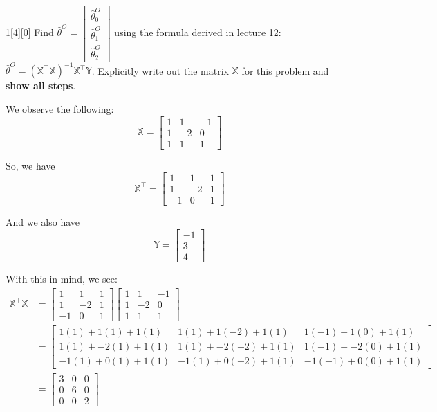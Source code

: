 \documentclass{article}
\begin{document}
\begin{dshw}{1}[4][0]
	Find $\hat{\theta}^O = \begin{bmatrix} \hat{\theta}_0^{O} \\ \hat{\theta}_1^{O} \\  \hat{\theta}_2^{O} \end{bmatrix}$ using the formula derived in lecture 12:
	$\hat{\theta}^O = (\mathbb{X}^{\top} \mathbb{X})^{-1} \mathbb{X}^{\top} \mathbb{Y}$. Explicitly write out the matrix $\mathbb{X}$ for this problem and \textbf{show all steps}.
\end{dshw}
\begin{solution}
	We observe the following:
	\begin{equation*}
		\mathbb X = \begin{bmatrix}
			1 & 1 & -1 \\ 1 & -2 & 0 \\ 1 & 1 & 1
		\end{bmatrix}
	\end{equation*}

	So, we have
	\begin{equation*}
		\mathbb X^{\intercal} = \begin{bmatrix}
			1 & 1 & 1\\
			1 & -2 & 1 \\
			-1 & 0 & 1
		\end{bmatrix}
	\end{equation*}

	And we also have
	\begin{equation*}
		\mathbb Y = \begin{bmatrix}
			-1 \\ 3 \\ 4
		\end{bmatrix}
	\end{equation*}

	With this in mind, we see:
	\begin{align*}
		\mathbb X^{\intercal} \mathbb X &= \begin{bmatrix}
			1 & 1 & 1\\
			1 & -2 & 1 \\
			-1 & 0 & 1
		\end{bmatrix}\begin{bmatrix}
		1 & 1 & -1 \\ 1 & -2 & 0 \\ 1 & 1 & 1
	\end{bmatrix} \\
	&= \begin{bmatrix}
		1(1) + 1(1) + 1(1) & 1(1) + 1(-2) + 1(1) & 1(-1) + 1(0) + 1(1) \\
		1(1) + -2(1) + 1(1) & 1(1) + -2(-2) + 1(1) & 1(-1) + -2(0) + 1(1) \\
		-1(1) + 0(1) + 1(1) & -1(1) + 0(-2) + 1(1) & -1(-1) + 0(0) + 1(1)
	\end{bmatrix} \\
	&= \begin{bmatrix}
		3 & 0 & 0 \\
		0 & 6 & 0 \\
		0 & 0 & 2
	\end{bmatrix}
	\end{align*}


\end{solution}
\end{document}
